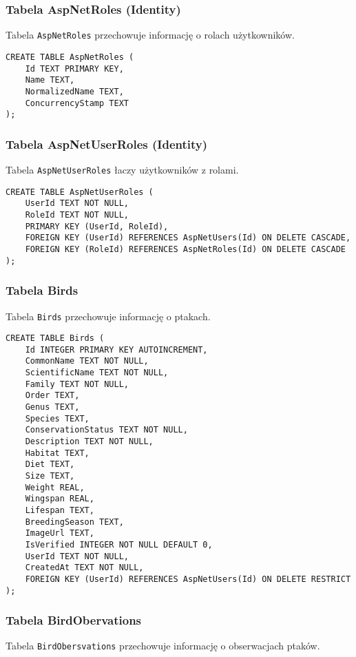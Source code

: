 \subsubsection{Tabela AspNetRoles (Identity)}
Tabela \texttt{AspNetRoles} przechowuje informację o rolach użytkowników.

\begin{lstlisting}[style=sqlstyle, caption={Struktura tabeli AspNetRoles}]
CREATE TABLE AspNetRoles (
	Id TEXT PRIMARY KEY,
	Name TEXT,
	NormalizedName TEXT,
	ConcurrencyStamp TEXT
);
\end{lstlisting}

\subsubsection{Tabela AspNetUserRoles (Identity)}
Tabela \texttt{AspNetUserRoles} łaczy użytkowników z rolami.

\begin{lstlisting}[style=sqlstyle, caption={Struktura tabeli AspNetRoles}]
CREATE TABLE AspNetUserRoles (
	UserId TEXT NOT NULL,
	RoleId TEXT NOT NULL,
	PRIMARY KEY (UserId, RoleId),
	FOREIGN KEY (UserId) REFERENCES AspNetUsers(Id) ON DELETE CASCADE,
	FOREIGN KEY (RoleId) REFERENCES AspNetRoles(Id) ON DELETE CASCADE
);
\end{lstlisting}

\subsubsection{Tabela Birds}
Tabela \texttt{Birds} przechowuje informację o ptakach.

\begin{lstlisting}[style=sqlstyle, caption={Struktura tabeli AspNetRoles}]
CREATE TABLE Birds (
	Id INTEGER PRIMARY KEY AUTOINCREMENT,
	CommonName TEXT NOT NULL,
	ScientificName TEXT NOT NULL,
	Family TEXT NOT NULL,
	Order TEXT,
	Genus TEXT,
	Species TEXT,
	ConservationStatus TEXT NOT NULL,
	Description TEXT NOT NULL,
	Habitat TEXT,
	Diet TEXT,
	Size TEXT,
	Weight REAL,
	Wingspan REAL,
	Lifespan TEXT,
	BreedingSeason TEXT,
	ImageUrl TEXT,
	IsVerified INTEGER NOT NULL DEFAULT 0,
	UserId TEXT NOT NULL,
	CreatedAt TEXT NOT NULL,
	FOREIGN KEY (UserId) REFERENCES AspNetUsers(Id) ON DELETE RESTRICT
);
\end{lstlisting}

\subsubsection{Tabela BirdObervations}
Tabela \texttt{BirdObersvations} przechowuje informację o obserwacjach ptaków.

